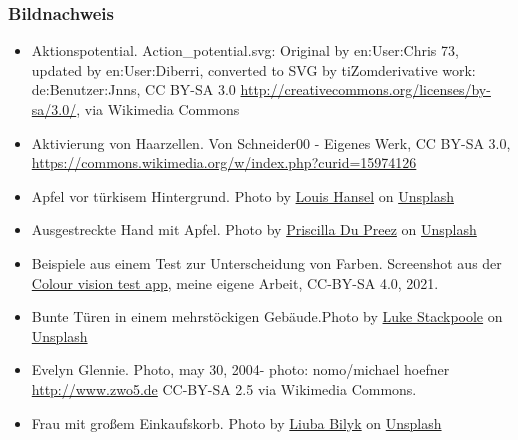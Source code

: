 \documentclass{beamer}
\begin{document}
\begin{frame}
\frametitle{Bildnachweis}
\begin{tiny}



 
\begin{itemize}


\item
Aktionspotential. Action\_potential.svg: Original by en:User:Chris 73, updated by en:User:Diberri, converted to SVG by tiZomderivative work: de:Benutzer:Jnns, CC BY-SA 3.0 \url{http://creativecommons.org/licenses/by-sa/3.0/}, via Wikimedia Commons

\item
Aktivierung von Haarzellen. Von Schneider00 - Eigenes Werk, CC BY-SA 3.0, \url{https://commons.wikimedia.org/w/index.php?curid=15974126}

\item
Apfel vor türkisem Hintergrund. Photo by \href{https://unsplash.com/@louishansel?utm_source=unsplash&utm_medium=referral&utm_content=creditCopyText}{Louis Hansel} on \href{https://unsplash.com/s/photos/apple?utm_source=unsplash&utm_medium=referral&utm_content=creditCopyText}{Unsplash}
  
\item
Ausgestreckte Hand mit Apfel. Photo by \href{https://unsplash.com/@priscilladupreez?utm_source=unsplash&utm_medium=referral&utm_content=creditCopyText}{Priscilla Du Preez} on \href{https://unsplash.com/s/photos/apple?utm_source=unsplash&utm_medium=referral&utm_content=creditCopyText}{Unsplash}
  
  

\item
Beispiele aus einem Test zur Unterscheidung von Farben. Screenshot aus der \href{https://melamela.shinyapps.io/colour_vision/}{Colour vision test app}, meine eigene Arbeit, CC-BY-SA 4.0, 2021. 

\item
Bunte Türen in einem mehrstöckigen Gebäude.Photo by \href{https://unsplash.com/@withluke?utm_source=unsplash&utm_medium=referral&utm_content=creditCopyText}{Luke Stackpoole} on \href{https://unsplash.com/s/photos/colours?utm_source=unsplash&utm_medium=referral&utm_content=creditCopyText}{Unsplash}
  
\item
Evelyn Glennie. Photo, may 30, 2004- photo: nomo/michael hoefner \url{http://www.zwo5.de} CC-BY-SA 2.5 via Wikimedia Commons.

\item 
Frau mit großem Einkaufskorb. Photo by \href{https://unsplash.com/@ibilyk?utm_source=unsplash&utm_medium=referral&utm_content=creditCopyText}{Liuba Bilyk} on \href{https://unsplash.com/s/photos/carrying-groceries?utm_source=unsplash&utm_medium=referral&utm_content=creditCopyText}{Unsplash}
  

\end{itemize}
\end{tiny}
\end{frame}
\end{document}
